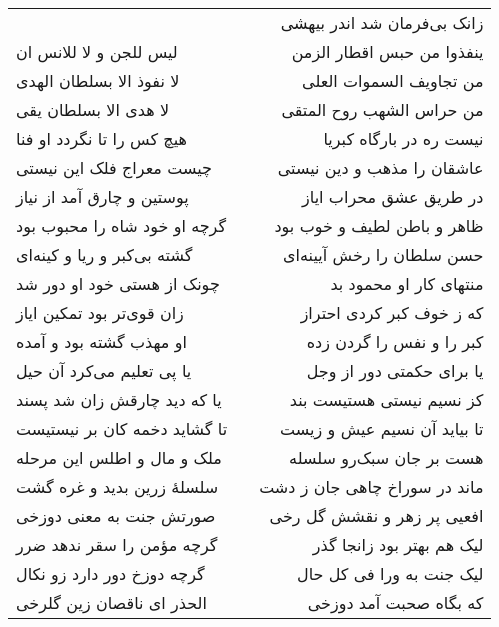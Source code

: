 \begin{center}
\begin{longtable}{l p{0.5cm} r}
&&
زانک بی‌فرمان شد اندر بیهشی
\\
لیس للجن و لا للانس ان
&&
ینفذوا من حبس اقطار الزمن
\\
لا نفوذ الا بسلطان الهدی
&&
من تجاویف السموات العلی
\\
لا هدی الا بسلطان یقی
&&
من حراس الشهب روح المتقی
\\
هیچ کس را تا نگردد او فنا
&&
نیست ره در بارگاه کبریا
\\
چیست معراج فلک این نیستی
&&
عاشقان را مذهب و دین نیستی
\\
پوستین و چارق آمد از نیاز
&&
در طریق عشق محراب ایاز
\\
گرچه او خود شاه را محبوب بود
&&
ظاهر و باطن لطیف و خوب بود
\\
گشته بی‌کبر و ریا و کینه‌ای
&&
حسن سلطان را رخش آیینه‌ای
\\
چونک از هستی خود او دور شد
&&
منتهای کار او محمود بد
\\
زان قوی‌تر بود تمکین ایاز
&&
که ز خوف کبر کردی احتراز
\\
او مهذب گشته بود و آمده
&&
کبر را و نفس را گردن زده
\\
یا پی تعلیم می‌کرد آن حیل
&&
یا برای حکمتی دور از وجل
\\
یا که دید چارقش زان شد پسند
&&
کز نسیم نیستی هستیست بند
\\
تا گشاید دخمه کان بر نیستیست
&&
تا بیاید آن نسیم عیش و زیست
\\
ملک و مال و اطلس این مرحله
&&
هست بر جان سبک‌رو سلسله
\\
سلسلهٔ زرین بدید و غره گشت
&&
ماند در سوراخ چاهی جان ز دشت
\\
صورتش جنت به معنی دوزخی
&&
افعیی پر زهر و نقشش گل رخی
\\
گرچه مؤمن را سقر ندهد ضرر
&&
لیک هم بهتر بود زانجا گذر
\\
گرچه دوزخ دور دارد زو نکال
&&
لیک جنت به ورا فی کل حال
\\
الحذر ای ناقصان زین گلرخی
&&
که بگاه صحبت آمد دوزخی
\\
\end{longtable}
\end{center}
